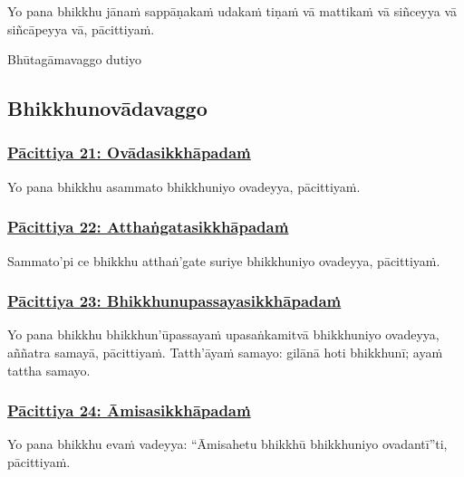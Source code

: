 Yo pana bhikkhu jānaṁ sappāṇakaṁ udakaṁ tiṇaṁ vā mattikaṁ vā siñceyya vā siñcāpeyya vā, pācittiyaṁ.

\begin{center}
	Bhūtagāmavaggo dutiyo
\end{center}



\subsection{Bhikkhunovādavaggo}

\subsubsection*{\hyperref[exp]{Pācittiya 21: Ovādasikkhāpadaṁ}}
\label{pac21}

Yo pana bhikkhu asammato bhikkhuniyo ovadeyya, pācittiyaṁ.



\subsubsection*{\hyperref[exp22]{Pācittiya 22: Atthaṅgatasikkhāpadaṁ}}
\label{pac22}

Sammato'pi ce bhikkhu atthaṅ'gate suriye bhikkhuniyo ovadeyya, pācittiyaṁ.



\subsubsection*{\hyperref[exp23]{Pācittiya 23: Bhikkhunupassayasikkhāpadaṁ}}
\label{pac23}

Yo pana bhikkhu bhikkhun'ūpassayaṁ upasaṅkamitvā bhikkhuniyo ovadeyya, aññatra samayā, pācittiyaṁ. Tatth'āyaṁ samayo: gilānā hoti bhikkhunī; ayaṁ tattha samayo.



\subsubsection*{\hyperref[exp24]{Pācittiya 24: Āmisasikkhāpadaṁ}}
\label{pac24}

Yo pana bhikkhu evaṁ vadeyya: ``Āmisahetu bhikkhū bhikkhuniyo ovadantī''ti, pācittiyaṁ.



